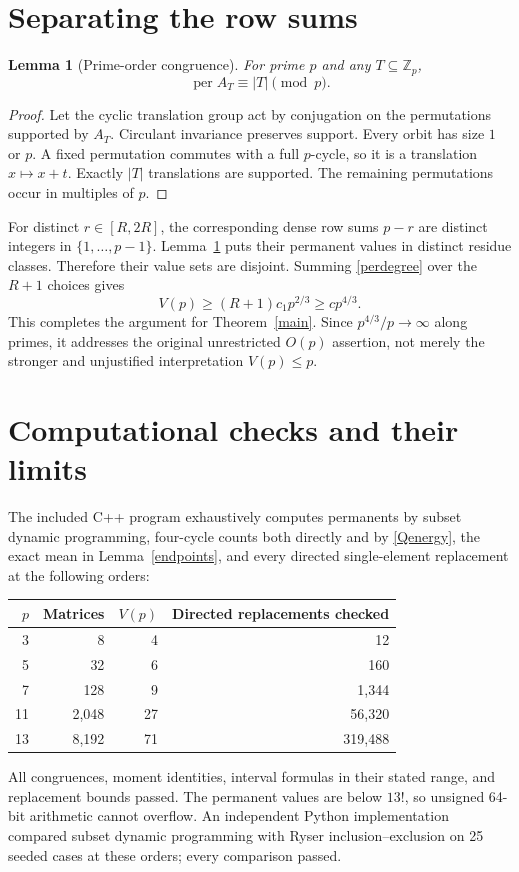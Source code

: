\documentclass[11pt,a4paper]{article}
\newcommand{\per}{\operatorname{per}}
\newcommand{\Z}{\mathbb Z}
\newtheorem{lemma}[theorem]{Lemma}
\begin{document}
\section{Separating the row sums}
\begin{lemma}[Prime-order congruence]\label{congruence}
For prime $p$ and any $T\subseteq\Z_p$,
\[
 \per A_T\equiv |T|\pmod p.
\]
\end{lemma}
\begin{proof}
Let the cyclic translation group act by conjugation on the permutations supported by $A_T$. Circulant invariance preserves support. Every orbit has size $1$ or $p$. A fixed permutation commutes with a full $p$-cycle, so it is a translation $x\mapsto x+t$. Exactly $|T|$ translations are supported. The remaining permutations occur in multiples of $p$.
\end{proof}

For distinct $r\in[R,2R]$, the corresponding dense row sums $p-r$ are distinct integers in $\{1,\ldots,p-1\}$. Lemma~\ref{congruence} puts their permanent values in distinct residue classes. Therefore their value sets are disjoint. Summing \eqref{perdegree} over the $R+1$ choices gives
\[
 V(p)\ge(R+1)c_1p^{2/3}\ge c p^{4/3}.
\]
This completes the argument for Theorem~\ref{main}. Since $p^{4/3}/p\to\infty$ along primes, it addresses the original unrestricted $O(p)$ assertion, not merely the stronger and unjustified interpretation $V(p)\le p$.

\section{Computational checks and their limits}
The included C++ program exhaustively computes permanents by subset dynamic programming, four-cycle counts both directly and by \eqref{Qenergy}, the exact mean in Lemma~\ref{endpoints}, and every directed single-element replacement at the following orders:
\begin{center}
\begin{tabular}{rrrr}
\toprule
$p$ & Matrices & $V(p)$ & Directed replacements checked\\
\midrule
3&8&4&12\\
5&32&6&160\\
7&128&9&1,344\\
11&2,048&27&56,320\\
13&8,192&71&319,488\\
\bottomrule
\end{tabular}
\end{center}
All congruences, moment identities, interval formulas in their stated range, and replacement bounds passed. The permanent values are below $13!$, so unsigned 64-bit arithmetic cannot overflow. An independent Python implementation compared subset dynamic programming with Ryser inclusion--exclusion on 25 seeded cases at these orders; every comparison passed.
\end{document}
